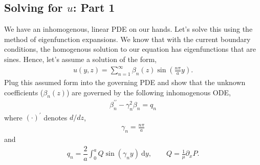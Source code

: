 \documentclass[11pt]{article}
\begin{document}


    \subsection{Solving for $u$: Part 1}
    We have an inhomogenous, linear PDE on our hands.  Let's solve this using the method of eigenfunction expansions.  We
know that with the current boundary conditions, the homogenous solution to our equation has eigenfunctions that are sines.
Hence, let's assume a solution of the form,
    \begin{align}
      u\left(y, z\right) = \sum_{n=1}^{\infty}{\beta_{n}\left(z\right)\sin\left(\frac{n\pi}{a}y\right)}.
    \end{align}
    Plug this assumed form into the governing PDE and show that the unknown coefficients ($\beta_{n}\left(z\right)$) are
governed by the following inhomogenous ODE,
    \begin{align}
      \beta_{n}^{\prime\prime} - \gamma_{n}^{2}\beta_{n} = q_{n} \label{eq:betan}
    \end{align}
    where $\left(\cdot\right)^{\prime}$ denotes $d/dz$, 
    \begin{align}
      \gamma_{n} = \frac{n\pi}{a}
    \end{align}
    and 
    \begin{align}
      q_{n} = \dfrac{2}{a}\int_{0}^{a}{Q\sin\left(\gamma_{n}y\right)\ \mathrm{d}y}, \qquad Q = \frac{1}{\mu}\partial_{x}P.
    \end{align}
\end{document}
